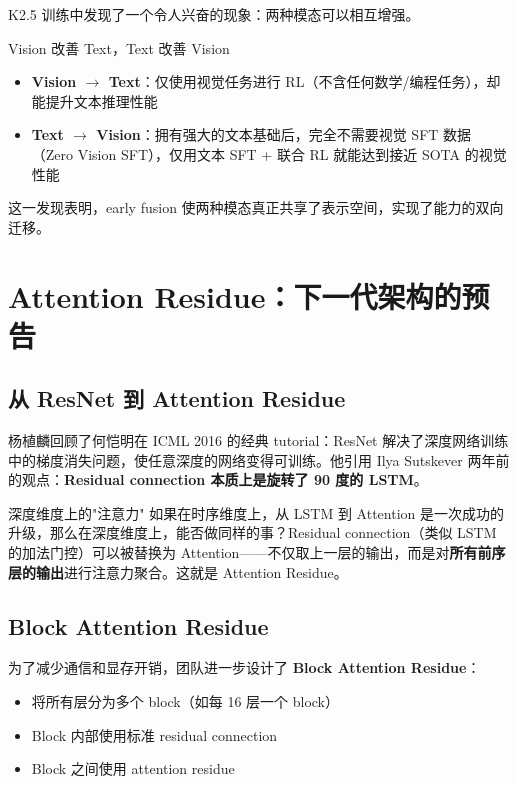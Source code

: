 \documentclass[a4paper]{article}
\begin{document}
K2.5 训练中发现了一个令人兴奋的现象：两种模态可以相互增强。

\begin{importantbox}{Vision 改善 Text，Text 改善 Vision}
\begin{itemize}
    \item \textbf{Vision $\rightarrow$ Text}：仅使用视觉任务进行 RL（不含任何数学/编程任务），却能提升文本推理性能
    \item \textbf{Text $\rightarrow$ Vision}：拥有强大的文本基础后，完全不需要视觉 SFT 数据（Zero Vision SFT），仅用文本 SFT + 联合 RL 就能达到接近 SOTA 的视觉性能
\end{itemize}
这一发现表明，early fusion 使两种模态真正共享了表示空间，实现了能力的双向迁移。
\end{importantbox}


\section{Attention Residue：下一代架构的预告}

\subsection{从 ResNet 到 Attention Residue}

杨植麟回顾了何恺明在 ICML 2016 的经典 tutorial：ResNet 解决了深度网络训练中的梯度消失问题，使任意深度的网络变得可训练。他引用 Ilya Sutskever 两年前的观点：\textbf{Residual connection 本质上是旋转了 90 度的 LSTM}。

\begin{knowledgebox}{深度维度上的"注意力"}
如果在时序维度上，从 LSTM 到 Attention 是一次成功的升级，那么在深度维度上，能否做同样的事？Residual connection（类似 LSTM 的加法门控）可以被替换为 Attention——不仅取上一层的输出，而是对\textbf{所有前序层的输出}进行注意力聚合。这就是 Attention Residue。
\end{knowledgebox}

\subsection{Block Attention Residue}

为了减少通信和显存开销，团队进一步设计了 \textbf{Block Attention Residue}：
\begin{itemize}
    \item 将所有层分为多个 block（如每 16 层一个 block）
    \item Block 内部使用标准 residual connection
    \item Block 之间使用 attention residue
\end{itemize}
\end{document}
